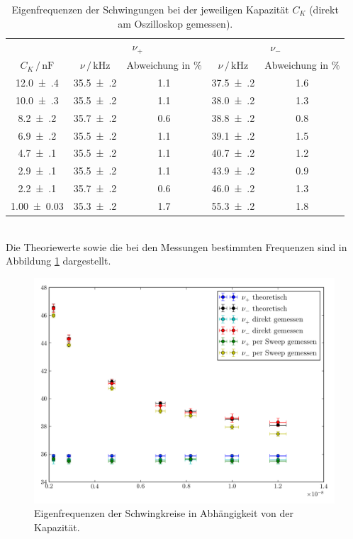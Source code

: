 \documentclass[
  bibliography=totoc,     %
  captions=tableheading,  %
  titlepage=firstiscover, %
]{scrartcl}
\begin{document}
\begin{table}
  \centering
  \caption{Eigenfrequenzen der Schwingungen bei der jeweiligen Kapazität $C_K$ (direkt am Oszilloskop gemessen).}
  \label{tab:ergebnisse2}
  \begin{tabular}{S S S S S}
    \toprule
    &  & \\
    {$C_K \,/\, \si{\nano\farad}$} & {$\nu \,/\, \si{\kilo\hertz}$} & {Abweichung in $\si{\percent}$} & {$\nu \,/\, \si{\kilo\hertz}$} & {Abweichung in $\si{\percent}$}\\
    \midrule
    \num{12.0(4)} & \num{35.5(2)} & 1.1 & \num{37.5(2)} & 1.6\\
    \num{10.0(3)} & \num{35.5(2)} & 1.1 & \num{38.0(2)} & 1.3\\
    \num{8.2(2)} & \num{35.7(2)} & 0.6 & \num{38.8(2)} & 0.8\\
    \num{6.9(2)} & \num{35.5(2)} & 1.1 & \num{39.1(2)} & 1.5\\
    \num{4.7(1)} & \num{35.5(2)} & 1.1 & \num{40.7(2)} & 1.2\\
    \num{2.9(1)} & \num{35.5(2)} & 1.1 & \num{43.9(2)} & 0.9\\
    \num{2.2(1)} & \num{35.7(2)} & 0.6 & \num{46.0(2)} & 1.3\\
    \num{1.00(3)} & \num{35.3(2)} & 1.7 & \num{55.3(2)} & 1.8\\
    \bottomrule
  \end{tabular}
\end{table}\\
Die Theoriewerte sowie die bei den Messungen bestimmten Frequenzen sind in Abbildung
\ref{fig:plot} dargestellt.
\begin{figure}[htb]
  \centering
  \includegraphics[width=\textwidth]{Plot.pdf}
  \caption{Eigenfrequenzen der Schwingkreise in Abhängigkeit von der Kapazität.}
  \label{fig:plot}
\end{figure}
\clearpage
\end{document}
